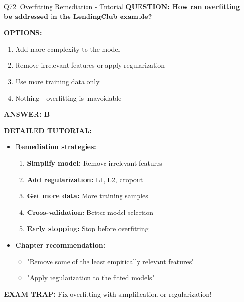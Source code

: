 \documentclass[8pt]{beamer}
\begin{document}
	\begin{frame}{Q72: Overfitting Remediation - Tutorial}
		\fontsize{6.5}{7.5}\selectfont
		\textbf{QUESTION: How can overfitting be addressed in the LendingClub example?}
		
		\vspace{0.1cm}
		\textbf{OPTIONS:}
		\begin{enumerate}
			\item Add more complexity to the model
			\item Remove irrelevant features or apply regularization
			\item Use more training data only
			\item Nothing - overfitting is unavoidable
		\end{enumerate}
		
		\vspace{0.1cm}
		\textcolor{myblue}{\textbf{ANSWER: B}}
		
		\vspace{0.1cm}
		\textbf{DETAILED TUTORIAL:}
		\begin{itemize}
			\item \textbf{Remediation strategies:}
			\begin{enumerate}
				\item \textbf{Simplify model:} Remove irrelevant features
				\item \textbf{Add regularization:} L1, L2, dropout
				\item \textbf{Get more data:} More training samples
				\item \textbf{Cross-validation:} Better model selection
				\item \textbf{Early stopping:} Stop before overfitting
			\end{enumerate}
			\item \textbf{Chapter recommendation:}
			\begin{itemize}
				\item "Remove some of the least empirically relevant features"
				\item "Apply regularization to the fitted models"
			\end{itemize}
		\end{itemize}
		
		\textcolor{myred}{\textbf{EXAM TRAP:}} Fix overfitting with \textcolor{myblue}{simplification or regularization}!
	\end{frame}
	
\end{document}

